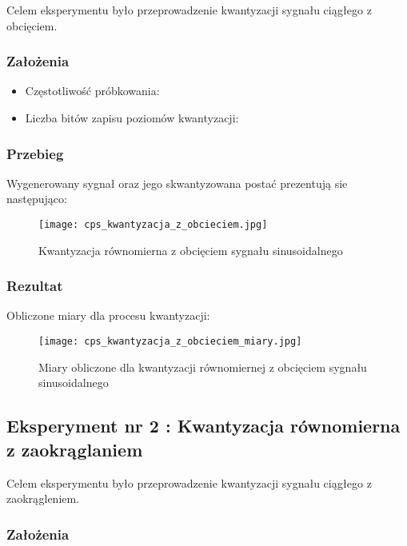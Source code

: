 \documentclass[12pt]{article}
\begin{document}
Celem eksperymentu było przeprowadzenie kwantyzacji sygnału ciągłego z obcięciem.

\subsubsection{Założenia}

\begin{itemize}
    \item Częstotliwość próbkowania:
    \item Liczba bitów zapisu poziomów kwantyzacji:
\end{itemize}
\subsubsection{Przebieg}
Wygenerowany sygnał oraz jego skwantyzowana postać prezentują sie następująco:
\begin{figure}[H]
    \centering
    \texttt{[image: cps\_kwantyzacja\_z\_obcieciem.jpg]}
    \caption{Kwantyzacja równomierna z obcięciem sygnału sinusoidalnego}
    \label{wykres dla eksperymentu 1}
\end{figure}

\subsubsection{Rezultat}
Obliczone miary dla procesu kwantyzacji:
\begin{figure}[H]
    \centering
    \texttt{[image: cps\_kwantyzacja\_z\_obcieciem\_miary.jpg]}
    \caption{Miary obliczone dla kwantyzacji równomiernej z obcięciem sygnału sinusoidalnego}
    \label{Wartości dla eksperymentu 1}
\end{figure}




\newpage
\subsection{Eksperyment nr 2 : Kwantyzacja równomierna z zaokrąglaniem}

Celem eksperymentu było przeprowadzenie kwantyzacji sygnału ciągłego z zaokrągleniem.

\subsubsection{Założenia}
\end{document}
